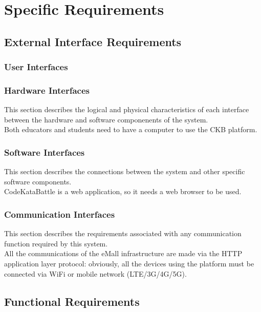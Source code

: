 \chapter{Specific Requirements}

\section{External Interface Requirements}
\subsection{User Interfaces}
\subsection{Hardware Interfaces}
This section describes the logical and physical characteristics of each interface 
between the hardware and software componenents of the system.\\
Both educators and students need to have a computer to use the CKB platform.\\
\subsection{Software Interfaces}
This section describes the connections between the system and other specific software components.\\
CodeKataBattle is a web application, so it needs a web browser to be used.\\
\subsection{Communication Interfaces}
This section describes the requirements associated with any communication function required
by this system.\\
All the communications of the eMall infrastructure are made via the HTTP application layer
protocol: obviously, all the devices using the platform must be connected via WiFi or mobile
network (LTE/3G/4G/5G).\\

\section{Functional Requirements}
